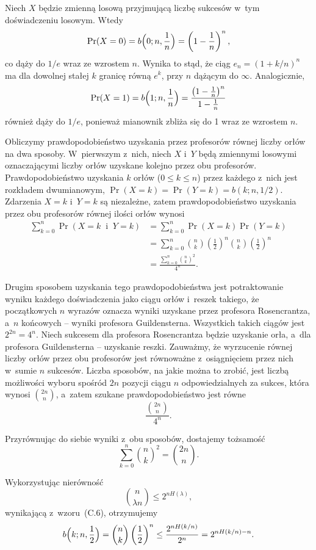 \exercise{} %
Niech $X$ będzie zmienną losową przyjmującą liczbę sukcesów w~tym doświadczeniu losowym. Wtedy
\[
	\Pr(X=0) = b\Bigl(0;n,\frac{1}{n}\Bigr) = \left(1-\frac{1}{n}\right)^n,
\]
co dąży do $1/e$ wraz ze wzrostem $n$. Wynika to stąd, że ciąg $e_n={(1+k/n)}^n$ ma dla dowolnej stałej $k$ granicę równą $e^k$, przy $n$ dążącym do $\infty$.
Analogicznie,
\[
	\Pr(X=1) = b\Bigl(1;n,\frac{1}{n}\Bigr) = \frac{\left(1-\frac{1}{n}\right)^n}{1-\frac{1}{n}}
\]
również dąży do $1/e$, ponieważ mianownik zbliża się do 1 wraz ze wzrostem $n$.

\exercise{} %
Obliczymy prawdopodobieństwo uzyskania przez profesorów równej liczby orłów na dwa sposoby. W~pierwszym z~nich, niech $X$ i~$Y$ będą zmiennymi losowymi oznaczającymi liczby orłów uzyskane kolejno przez obu profesorów. Prawdopodobieństwo uzyskania $k$ orłów ($0\le k\le n$) przez każdego z~nich jest rozkładem dwumianowym, $\Pr(X=k)=\Pr(Y=k)=b(k;n,1/2)$. Zdarzenia $X=k$ i~$Y=k$ są niezależne, zatem prawdopodobieństwo uzyskania przez obu profesorów równej ilości orłów wynosi
\begin{align*}
	\sum_{k=0}^n\Pr(X=k\;\;\text{i}\;\;Y=k) &= \sum_{k=0}^n\Pr(X=k)\Pr(Y=k) \\
	&= \sum_{k=0}^n\binom{n}{k}\left(\frac{1}{2}\right)^n\binom{n}{k}\left(\frac{1}{2}\right)^n \\
	&= \frac{\sum_{k=0}^n\binom{n}{k}^2}{4^n}.
\end{align*}

Drugim sposobem uzyskania tego prawdopodobieństwa jest potraktowanie wyniku każdego doświadczenia jako  ciągu orłów i~reszek takiego, że początkowych $n$ wyrazów oznacza wyniki uzyskane przez profesora Rosencrantza, a~$n$ końcowych -- wyniki profesora Guildensterna. Wszystkich takich ciągów jest $2^{2n}=4^n$. Niech sukcesem dla profesora Rosencrantza będzie uzyskanie orła, a~dla profesora Guildensterna -- uzyskanie reszki. Zauważmy, że wyrzucenie równej liczby orłów przez obu profesorów jest równoważne z~osiągnięciem przez nich w~sumie $n$ sukcesów. Liczba sposobów, na jakie można to zrobić, jest liczbą możliwości wyboru spośród $2n$ pozycji ciągu $n$ odpowiedzialnych za sukces, która wynosi $\binom{2n}{n}$, a~zatem szukane prawdopodobieństwo jest równe
\[
	\frac{\binom{2n}{n}}{4^n}.
\]

Przyrównując do siebie wyniki z~obu sposobów, dostajemy tożsamość
\[
	\sum_{k=0}^n\binom{n}{k}^2 = \binom{2n}{n}.
\]

\exercise{} %
Wykorzystując nierówność
\[
	\binom{n}{\lambda n} \le 2^{nH(\lambda)},
\]
wynikającą z~wzoru~(C.6), otrzymujemy
\[
	b\Bigl(k;n,\frac{1}{2}\Bigr) = \binom{n}{k}\left(\frac{1}{2}\right)^n \le \frac{2^{nH(k/n)}}{2^n} = 2^{nH(k/n)-n}.
\]

